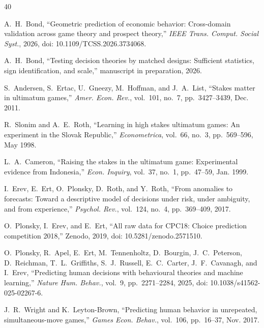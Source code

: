 \documentclass[journal]{IEEEtran}
\begin{document}
\begin{thebibliography}{40}

A.~H.~Bond, ``Geometric prediction of economic behavior: Cross-domain validation across game theory and prospect theory,''
\emph{IEEE Trans. Comput. Social Syst.}, 2026, doi: 10.1109/TCSS.2026.3734068. %

A.~H.~Bond, ``Testing decision theories by matched designs: Sufficient statistics, sign identification, and scale,'' manuscript in preparation, 2026.

S.~Andersen, S.~Ertac, U.~Gneezy, M.~Hoffman, and J.~A.~List, ``Stakes matter in ultimatum games,''
\emph{Amer. Econ. Rev.}, vol.~101, no.~7, pp.~3427--3439, Dec. 2011. %

R.~Slonim and A.~E.~Roth, ``Learning in high stakes ultimatum games: An experiment in the Slovak Republic,''
\emph{Econometrica}, vol.~66, no.~3, pp.~569--596, May 1998. %

L.~A.~Cameron, ``Raising the stakes in the ultimatum game: Experimental evidence from Indonesia,''
\emph{Econ. Inquiry}, vol.~37, no.~1, pp.~47--59, Jan. 1999. %

I.~Erev, E.~Ert, O.~Plonsky, D.~Roth, and Y.~Roth, ``From anomalies to forecasts: Toward a descriptive model of decisions under risk, under ambiguity, and from experience,''
\emph{Psychol. Rev.}, vol.~124, no.~4, pp.~369--409, 2017.

O.~Plonsky, I.~Erev, and E.~Ert, ``All raw data for CPC18: Choice prediction competition 2018,''
Zenodo, 2019, doi: 10.5281/zenodo.2571510.

O.~Plonsky, R.~Apel, E.~Ert, M.~Tennenholtz, D.~Bourgin, J.~C.~Peterson, D.~Reichman,
T.~L.~Griffiths, S.~J.~Russell, E.~C.~Carter, J.~F.~Cavanagh, and I.~Erev, ``Predicting human
decisions with behavioural theories and machine learning,'' \emph{Nature Hum. Behav.},
vol.~9, pp.~2271--2284, 2025, doi: 10.1038/s41562-025-02267-6.

J.~R.~Wright and K.~Leyton-Brown, ``Predicting human behavior in unrepeated, simultaneous-move games,''
\emph{Games Econ. Behav.}, vol.~106, pp.~16--37, Nov. 2017.


\end{thebibliography}
\end{document}
